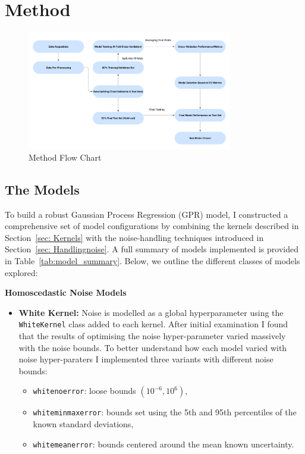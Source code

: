 \documentclass[12pt]{article}
\begin{document}
\section{Method}
\begin{figure}[H]
    \centering
   \includegraphics[width=0.8\textwidth]{LatexPlots/Flowchart.png}
    \caption{Method Flow Chart}
    \label{fig:flowchart}
\end{figure}
\subsection{The Models}
\label{subsec:Models}
To build a robust Gaussian Process Regression (GPR) model, I constructed a comprehensive set of model configurations by combining the kernels described in Section~\ref{sec: Kernels} with the noise-handling techniques introduced in Section~\ref{sec: Handlingnoise}. 
A full summary of models implemented is provided in Table~\ref{tab:model_summary}. Below, we outline the different classes of models explored:

\noindent
\textbf{Homoscedastic Noise Models}
\begin{itemize}
    \item \textbf{White Kernel:} Noise is modelled as a global hyperparameter using the \texttt{WhiteKernel} class added to each kernel.
    After initial examination I found that the results of optimising the noise hyper-parameter varied massively with the noise bounds. 
    To better understand how each model varied with noise hyper-paraters I implemented three variants with different noise bounds:
    \begin{itemize}
        \item \texttt{whitenoerror}: loose bounds \((10^{-6}, 10^6)\),
        \item \texttt{whiteminmaxerror}: bounds set using the 5th and 95th percentiles of the known standard deviations,
        \item \texttt{whitemeanerror}: bounds centered around the mean known uncertainty.
    \end{itemize}
\end{itemize}
%
%
\end{document}
